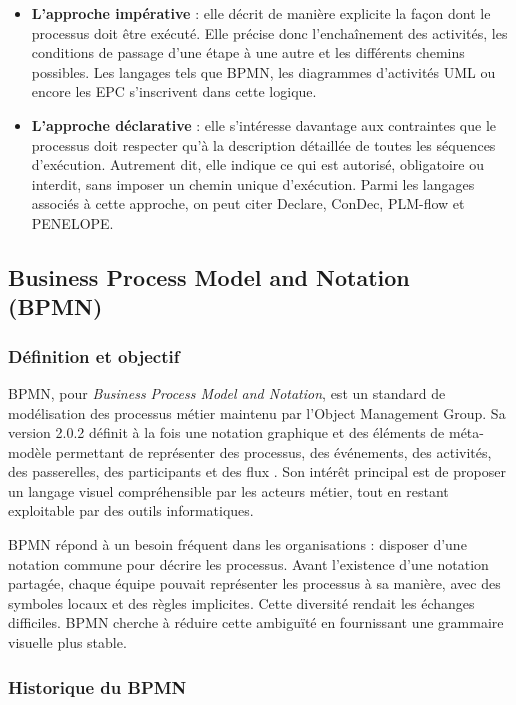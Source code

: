 \begin{itemize}
    \item \textbf{L'approche impérative} : elle décrit de manière explicite la façon dont le
    processus doit être exécuté. Elle précise donc l'enchaînement des activités, les conditions
    de passage d'une étape à une autre et les différents chemins possibles. Les langages tels que
    BPMN, les diagrammes d'activités UML ou encore les EPC s'inscrivent dans cette logique.

    \item \textbf{L'approche déclarative} : elle s'intéresse davantage aux contraintes que le
    processus doit respecter qu'à la description détaillée de toutes les séquences d'exécution.
    Autrement dit, elle indique ce qui est autorisé, obligatoire ou interdit, sans imposer un
    chemin unique d'exécution. Parmi les langages associés à cette approche, on peut citer
    Declare, ConDec, PLM-flow et PENELOPE.
\end{itemize}
\subsection*{Business Process Model and Notation (BPMN)}

\subsubsection*{Définition et objectif}

BPMN, pour \textit{Business Process Model and Notation}, est un standard de modélisation des processus métier maintenu par l'Object Management Group. Sa version 2.0.2 définit à la fois une notation graphique et des éléments de méta-modèle permettant de représenter des processus, des événements, des activités, des passerelles, des participants et des flux \cite{omg2013bpmn}. Son intérêt principal est de proposer un langage visuel compréhensible par les acteurs métier, tout en restant exploitable par des outils informatiques.

BPMN répond à un besoin fréquent dans les organisations : disposer d'une notation commune pour décrire les processus. Avant l'existence d'une notation partagée, chaque équipe pouvait représenter les processus à sa manière, avec des symboles locaux et des règles implicites. Cette diversité rendait les échanges difficiles. BPMN cherche à réduire cette ambiguïté en fournissant une grammaire visuelle plus stable.

\subsubsection*{Historique du BPMN}

